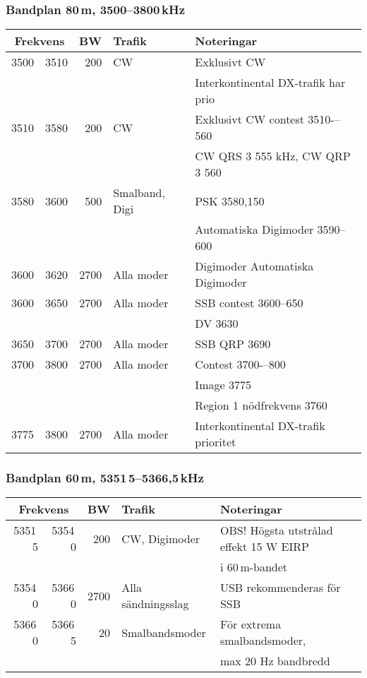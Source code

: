 \subsubsection{Bandplan 80\,m, 3500--3800\,kHz}
\begin{tabular}{rrrll}
\multicolumn{2}{c}{\textbf{Frekvens}} & \textbf{BW} & \textbf{Trafik} & \textbf{Noteringar} \\ \hline
3500 & 3510 & 200  & CW             & Exklusivt CW                         \\
      &       &      &                & Interkontinental DX-trafik har prio  \\ \hline
3510 & 3580 & 200  & CW             & Exklusivt CW contest 3510-–560       \\
      &       &      &                & CW QRS 3 555 kHz, CW QRP 3 560       \\ \hline
3580 & 3600 & 500  & Smalband, Digi & PSK 3580,150                        \\
      &       &      &                & Automatiska Digimoder 3590--600     \\ \hline
3600 & 3620 & 2700 & Alla moder     & Digimoder Automatiska Digimoder      \\ \hline
3600 & 3650 & 2700 & Alla moder     & SSB contest 3600--650               \\
      &       &      &                & DV 3630                             \\ \hline
3650 & 3700 & 2700 & Alla moder     & SSB QRP 3690                        \\ \hline
3700 & 3800 & 2700 & Alla moder     & Contest 3700-–800                   \\
      &       &      &                & Image 3775                          \\
      &       &      &                & Region 1 nödfrekvens 3760           \\ \hline
3775 & 3800 & 2700 & Alla moder     & Interkontinental DX-trafik prioritet \\ \hline
\end{tabular}


\subsubsection{Bandplan 60\,m, 5351\,5--5366,5\,kHz}
\begin{tabular}{rrrll}
\multicolumn{2}{c}{\textbf{Frekvens}} & \textbf{BW} & \textbf{Trafik} & \textbf{Noteringar} \\ \hline
5351\,5 & 5354\,0 &  200 & CW, Digimoder      & OBS! Högsta utstrålad effekt 15 W EIRP\\
        &         &      &                    & i 60\,m-bandet\\ \hline
5354\,0 & 5366\,0 & 2700 & Alla sändningsslag & USB rekommenderas för SSB\\ \hline
5366\,0 & 5366\,5 &   20 & Smalbandsmoder     & För extrema smalbandsmoder,\\
        &         &      &                    & max 20 Hz bandbredd\\ \hline
\end{tabular}

